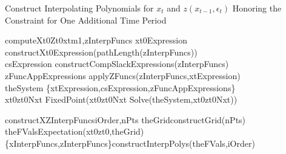 \documentclass{beamer}
\begin{document}
    \begin{frame}{Construct Interpolating Polynomials for $x_t$ and $z(x_{t-1},\epsilon_t)$ Honoring the Constraint for One Additional Time Period}
    	
    	{\small 
    	\begin{pseudocode}{computeXt0Zt0}{xtm1,zInterpFuncs}
    		xt0Expression \GETS constructXt0Expression(pathLength(zInterpFuncs))\\
    		csExpression \GETS constructCompSlackExpressions(zInterpFuncs)\\
    		zFuncAppExpressions \GETS applyZFuncs(zInterpFuncs,xtExpression)\\
    		theSystem \GETS \{xtExpression,csExpression,zFuncAppExpressions\}\\
    		xt0zt0Nxt \GETS FixedPoint(xt0zt0Nxt \GETS Solve(theSystem,xt0zt0Nxt))\\
    
    	\end{pseudocode}
    \begin{pseudocode}{constructXZInterpFuncs}{iOrder,nPts}
    	theGrid\GETS constructGrid(nPts)\\
    	theFVals\GETS Expectation(xt0zt0,theGrid)\\
    	\{xInterpFuncs,zInterpFuncs\}\GETS constructInterpPolys(theFVals,iOrder)\\
    
    \end{pseudocode}	
    }
    \end{frame}
    
\end{document}
